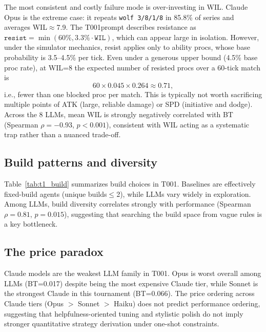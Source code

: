 \documentclass[11pt]{article}
\newcommand{\tOne}{T001}
\begin{document}
The most consistent and costly failure mode is over-investing in WIL.
Claude Opus is the extreme case: it repeats \texttt{wolf 3/8/1/8} in 85.8\% of series and averages WIL$\approx$7.9.
The \tOne prompt describes resistance as $\texttt{resist}=\min(60\%,3.3\%\cdot\texttt{WIL})$, which can appear large in isolation.
However, under the simulator mechanics, resist applies only to ability procs, whose base probability is 3.5--4.5\% per tick.
Even under a generous upper bound (4.5\% base proc rate), at WIL=8 the expected number of resisted procs over a 60-tick match is
\[
60 \times 0.045 \times 0.264 \approx 0.71,
\]
i.e., fewer than one blocked proc per match.
This is typically not worth sacrificing multiple points of ATK (large, reliable damage) or SPD (initiative and dodge).
Across the 8 LLMs, mean WIL is strongly negatively correlated with BT (Spearman $\rho=-0.93$, $p<0.001$), consistent with WIL acting as a systematic trap rather than a nuanced trade-off.

\subsection{Build patterns and diversity}

Table~\ref{tab:t1_build} summarizes build choices in \tOne.
Baselines are effectively fixed-build agents (unique builds$\le$2), while LLMs vary widely in exploration.
Among LLMs, build diversity correlates strongly with performance (Spearman $\rho=0.81$, $p=0.015$), suggesting that searching the build space from vague rules is a key bottleneck.

\subsection{The price paradox}

Claude models are the weakest LLM family in \tOne.
Opus is worst overall among LLMs (BT=0.017) despite being the most expensive Claude tier, while Sonnet is the strongest Claude in this tournament (BT=0.066).
The price ordering across Claude tiers (Opus $>$ Sonnet $>$ Haiku) does not predict performance ordering, suggesting that helpfulness-oriented tuning and stylistic polish do not imply stronger quantitative strategy derivation under one-shot constraints.
\end{document}
